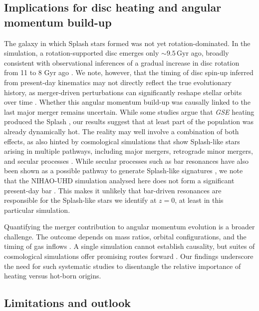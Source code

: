 \documentclass[fleqn,usenatbib]{mnras}
\begin{document}
\subsection{Implications for disc heating and angular momentum build-up}

The galaxy in which Splash stars formed was not yet rotation-dominated. In the simulation, a rotation-supported disc emerges only $\sim 9.5\,\mathrm{Gyr}$ ago, broadly consistent with observational inferences of a gradual increase in disc rotation from 11 to 8 Gyr ago \citep[e.g.][]{MCM2013}. We note, however, that the timing of disc spin-up inferred from present-day kinematics may not directly reflect the true evolutionary history, as merger-driven perturbations can significantly reshape stellar orbits over time \citep[e.g.][]{Orkney2026b}. Whether this angular momentum build-up was causally linked to the last major merger remains uncertain. While some studies argue that \textit{GSE} heating produced the Splash \citep{Bonaca2020, DiMatteo2019}, our results suggest that at least part of the population was already dynamically hot. The reality may well involve a combination of both effects, as also hinted by cosmological simulations that show Splash-like stars arising in multiple pathways, including major mergers, retrograde minor mergers, and secular processes \citep{Quinn1993, Purcell2010, Villalobos2008, Villalobos2009, Dillamore2023, Dillamore2025, Kisku2025}. While secular processes such as bar resonances have also been shown as a possible pathway to generate Splash-like signatures \citep{Dillamore2022,Dillamore2023}, we note that the NIHAO-UHD simulation analysed here does not form a significant present-day bar \citep{Buder2025}. This makes it unlikely that bar-driven resonances are responsible for the Splash-like stars we identify at $z=0$, at least in this particular simulation.

Quantifying the merger contribution to angular momentum evolution is a broader challenge. The outcome depends on mass ratios, orbital configurations, and the timing of gas inflows \citep[e.g.][]{Lagos2017, Lagos2018}. A single simulation cannot establish causality, but suites of cosmological simulations offer promising routes forward \citep{Fattahi2019, Pillepich2019, SotilloRamos2022}. Our findings underscore the need for such systematic studies to disentangle the relative importance of heating versus hot-born origins.

\subsection{Limitations and outlook}
\end{document}
